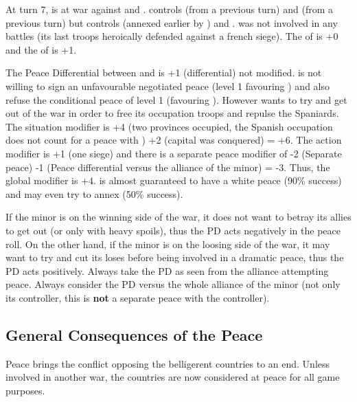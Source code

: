 \begin{exemple}
  At turn 7, \FRA is at war against \HIS and \paysSavoie. \FRA controls
  \provinceSavoia (from a previous turn) and \provinceBresse (from a previous
  turn) but \HIS controls \provinceArtois (annexed earlier by \FRA) and
  \provinceLanguedoc. \paysSavoie was not involved in any battles (its last
  troops heroically defended \provinceNice against a french siege). The
  \STAB of \FRA is +0 and the \STAB of \HIS is +1.

  The Peace Differential between \HIS and \FRA is +1 (\STAB differential) not
  modified. \HIS is not willing to sign an unfavourable negotiated peace
  (level 1 favouring \FRA) and \FRA also refuse the conditional peace of level
  1 (favouring \HIS). However \FRA wants to try and get \paysSavoie out of the
  war in order to free its occupation troops and repulse the Spaniards.  The
  situation modifier is +4 (two provinces occupied, the Spanish occupation
  does not count for a peace with \paysSavoie) +2 (capital was conquered) =
  +6. The action modifier is +1 (one siege) and there is a separate peace
  modifier of -2 (Separate peace) -1 (Peace differential versus the alliance
  of the minor) = -3. Thus, the global modifier is +4. \FRA is almost
  guaranteed to have a white peace (90\% success) and may even try to annex
  \provinceBresse (50\% success).
\end{exemple}

\begin{designnote}
  If the minor is on the winning side of the war, it does not want to betray
  its allies to get out (or only with heavy spoils), thus the PD acts
  negatively in the peace roll. On the other hand, if the minor is on the
  loosing side of the war, it may want to try and cut its loses before being
  involved in a dramatic peace, thus the PD acts positively. Always take the
  PD as seen from the alliance attempting peace. Always consider the PD versus
  the whole alliance of the minor (not only its controller, this is
  \textbf{not} a separate peace with the controller).
\end{designnote}

\subsection{General Consequences of the Peace}
\aparag Peace brings the conflict opposing the belligerent countries to an
end.
\bparag Unless involved in another war, the countries are now considered at
peace for all game purposes.


